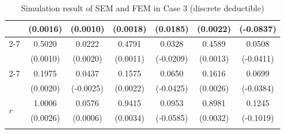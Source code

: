 \documentclass[11pt]{article}
\begin{document}
\begin{table}[!ht]
{{\begin{minipage}{0.65\textwidth}
\begin{tabular}{lcccccc}
         & (0.0016) & (0.0010) & (0.0018) & (0.0185) & (0.0022) & (-0.0837) \\
        \cmidrule{2-7}
         & 0.5020 & 0.0222 & 0.4791 & 0.0328 & 0.4589 & 0.0508 \\
         & (0.0010) & (0.0020) & (0.0011) & (-0.0209) & (0.0013) & (-0.0411) \\
        \cmidrule{2-7}
         & 0.1975 & 0.0437 & 0.1575 & 0.0650 & 0.1616 & 0.0699 \\
         & (0.0020) & (-0.0025) & (0.0022) & (-0.0425) & (0.0026) & (-0.0384) \\
        \midrule
        \multirow{2}{*}{$r$} & 1.0006 & 0.0576 & 0.9415 & 0.0953 & 0.8981 & 0.1245 \\
         & (0.0026) & (0.0006) & (0.0034) & (-0.0585) & (0.0032) & (-0.1019) \\
        \hhline{=======}
        \end{tabular}
    \end{minipage}
}
}
\caption{Simulation result of SEM and FEM in Case 3 (discrete deductible)}\label{tab:AppSimExoCase3}
\end{table}
\end{document}
